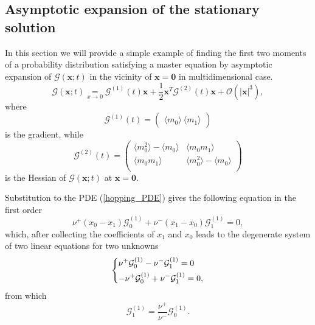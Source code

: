 \documentclass[a4paper, 11pt]{article}
\newcommand\underl[2]{\mathrel{\mathop{#2}\limits_{#1}}}
\begin{document}
\subsection{Asymptotic expansion of the stationary solution}
In this section we will provide a simple example of finding the first two moments of a probability distribution satisfying a master equation by asymptotic expansion of $\mathcal G(\mathbf x; t)$ in the vicinity of $\mathbf x = \mathbf 0$ in multidimensional case.
\begin{equation*}
  \mathcal G(\mathbf x; t)\underl{x\to 0}{=} \boldsymbol{\mathcal G}^{(1)}(t)\mathbf x + \frac{1}{2}\mathbf x^T\boldsymbol{\mathcal G}^{(2)}(t)\mathbf x + \mathcal O(|\mathbf x|^3),
\end{equation*}
where
\begin{equation*}
  \boldsymbol{\mathcal G}^{(1)}(t) =
  \begin{pmatrix}
    \langle m_0\rangle\ 
    \langle m_1 \rangle
  \end{pmatrix}
\end{equation*}
is the gradient, while
\begin{equation*}
  \boldsymbol{\mathcal G}^{(2)}(t) =
  \left( \begin{array}{cc}
    \langle m_0^2 \rangle - \langle m_0\rangle & \langle m_0m_1\rangle\\
    \langle m_0m_1\rangle & \langle m_0^2 \rangle - \langle m_0\rangle \\
  \end{array} \right)
\end{equation*}
is the Hessian of $\mathcal G(\mathbf x; t)$ at $\mathbf x = \mathbf 0$.

Substitution to the PDE (\ref{hopping_PDE}) gives the following equation in the first order
\begin{equation*}
  \nu^+(x_0-x_1)\mathcal G_0^{(1)} + \nu^-(x_1-x_0)\mathcal G_1^{(1)}=0,
\end{equation*}
which, after collecting the coefficients of $x_1$ and $x_0$ leads to the degenerate system of two linear equations for two unknowns
\begin{equation*}
  \begin{dcases}
    \nu^+\mathcal G_0^{(1)} - \nu^-\mathcal G_1^{(1)} = 0\\
    -\nu^+\mathcal G_0^{(1)} + \nu^-\mathcal G_1^{(1)} = 0,
  \end{dcases}
\end{equation*}
from which
\begin{equation*}
  \mathcal G_1^{(1)} = \frac{\nu^+}{\nu^-}\mathcal G_0^{(1)}.
\end{equation*}
\end{document}

